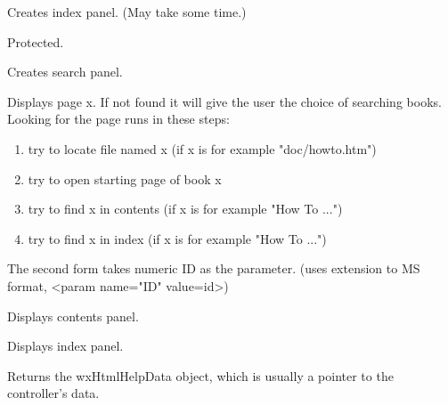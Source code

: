 
Creates index panel. (May take some time.)

Protected.

\label{wxhtmlhelpwindowcreatesearch}


Creates search panel.

\label{wxhtmlhelpwindowdisplay}



Displays page x. If not found it will give the user the choice of
searching books.
Looking for the page runs in these steps:

\begin{enumerate}\itemsep=0pt
\item try to locate file named x (if x is for example "doc/howto.htm")
\item try to open starting page of book x
\item try to find x in contents (if x is for example "How To ...")
\item try to find x in index (if x is for example "How To ...")
\end{enumerate}

The second form takes numeric ID as the parameter.
(uses extension to MS format, <param name="ID" value=id>)


\label{wxhtmlhelpwindowdisplaycontents}


Displays contents panel.

\label{wxhtmlhelpwindowdisplayindex}


Displays index panel.

\label{wxhtmlhelpwindowgetdata}


Returns the wxHtmlHelpData object, which is usually a pointer to the controller's data.

